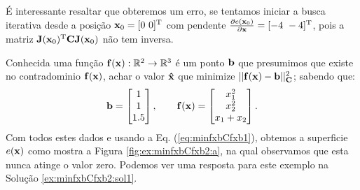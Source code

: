 \begin{SolutionT}
\label{ex:minfxbCfxb:sol2}
É interessante resaltar que obteremos um erro,
se tentamos iniciar a busca iterativa desde a posição  $\VECTOR{x}_0=[0~0]^{\transpose}$
com pendente $\frac{\partial e(\VECTOR{x}_0)}{\partial \VECTOR{x} }=[-4~-4]^{\transpose}$,
pois a matriz $\MATRIX{J}(\VECTOR{x}_0)^{\transpose}\MATRIX{C} \MATRIX{J}(\VECTOR{x}_0)$
não tem inversa.
\end{SolutionT}


\begin{example}
\label{ex:minfxbCfxb2}
Conhecida uma função $\VECTOR{f}(\VECTOR{x}) : \mathbb{R}^{2} \rightarrow \mathbb{R}^{3}$
é um ponto $\VECTOR{b}$ que presumimos que existe no contradominio $\VECTOR{f}(\VECTOR{x})$,
achar o valor $\VECTOR{\hat{x}}$ que minimize $||\VECTOR{f}(\VECTOR{x})-\VECTOR{b}||_{\MATRIX{C}}^2$;
sabendo que:
\begin{equation}
\VECTOR{b}=\begin{bmatrix}
1\\
1\\
1.5
\end{bmatrix},
\qquad 
\VECTOR{f}(\VECTOR{x})=\begin{bmatrix}
x_1^2\\
x_2^2\\
x_1+x_2
\end{bmatrix}.
\end{equation}
Com todos estes dados e usando a Eq. (\ref{eq:minfxbCfxb1}),
obtemos a superficie $e(\VECTOR{x})$ como mostra a Figura \ref{fig:ex:minfxbCfxb2:a},
na qual observamos que esta nunca atinge o valor zero.
Podemos ver uma resposta para este exemplo na Solução \ref{ex:minfxbCfxb2:sol1}.
\end{example}

